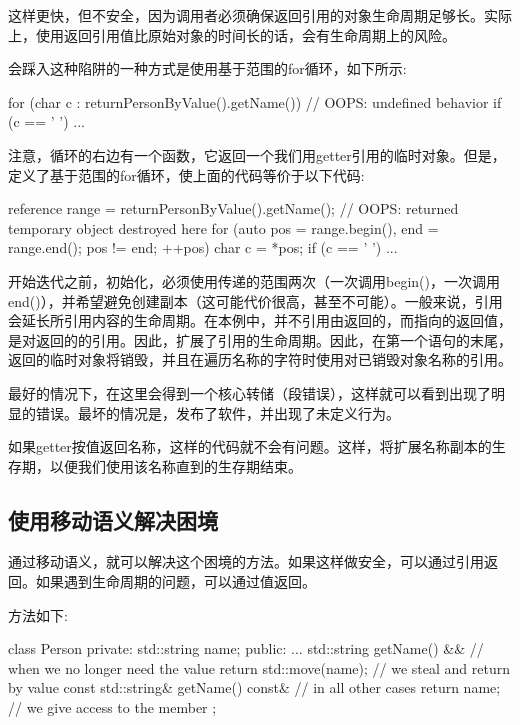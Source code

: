 这样更快，但不安全，因为调用者必须确保返回引用的对象生命周期足够长。实际上，使用返回引用值比原始对象的时间长的话，会有生命周期上的风险。

会踩入这种陷阱的一种方式是使用基于范围的for循环，如下所示:

\begin{cppcode}
for (char c : returnPersonByValue().getName()) { // OOPS: undefined behavior
	if (c == ' ') {
		...
	}
}
\end{cppcode}

注意，循环的右边有一个函数，它返回一个我们用getter引用的临时对象。但是，定义了基于范围的for循环，使上面的代码等价于以下代码:

\begin{cppcode}
reference range = returnPersonByValue().getName();
// OOPS: returned temporary object destroyed here
for (auto pos = range.begin(), end = range.end(); pos != end; ++pos) {
	char c = *pos;
	if (c == ' ') {
		...
	}
}
\end{cppcode}

开始迭代之前，初始化，必须使用传递的范围两次（一次调用begin()，一次调用end()），并希望避免创建副本（这可能代价很高，甚至不可能）。一般来说，引用会延长所引用内容的生命周期。在本例中，并不引用由返回的，而指向的返回值，是对返回的的引用。因此，扩展了引用的生命周期。因此，在第一个语句的末尾，返回的临时对象将销毁，并且在遍历名称的字符时使用对已销毁对象名称的引用。

最好的情况下，在这里会得到一个核心转储（段错误），这样就可以看到出现了明显的错误。最坏的情况是，发布了软件，并出现了未定义行为。

如果getter按值返回名称，这样的代码就不会有问题。这样，将扩展名称副本的生存期，以便我们使用该名称直到的生存期结束。

\subsection{使用移动语义解决困境}

通过移动语义，就可以解决这个困境的方法。如果这样做安全，可以通过引用返回。如果遇到生命周期的问题，可以通过值返回。

方法如下:

\begin{cppcode}
class Person
{
private:
	std::string name;
public:
	...
	std::string getName() && { // when we no longer need the value
		return std::move(name); // we steal and return by value
	}
	const std::string& getName() const& { // in all other cases
		return name; // we give access to the member
	}
};
\end{cppcode}


